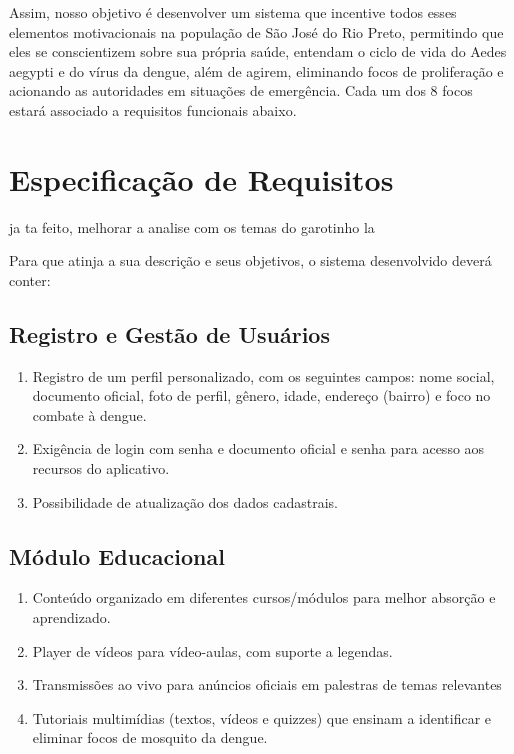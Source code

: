 \documentclass[a4paper, 12pt]{article}
\begin{document}
Assim, nosso objetivo é desenvolver um sistema que incentive todos esses elementos motivacionais na população de São José do Rio Preto, permitindo que eles se conscientizem sobre sua própria saúde, entendam o ciclo de vida do Aedes aegypti e do vírus da dengue, além de agirem, eliminando focos de proliferação e acionando as autoridades em situações de emergência. Cada um dos 8 focos estará associado a requisitos funcionais abaixo.

\newpage
\section{Especificação de Requisitos}

ja ta feito, melhorar a analise com os temas do garotinho la

Para que atinja a sua descrição e seus objetivos, o sistema desenvolvido deverá conter:

\subsection{Registro e Gestão de Usuários}
\begin{enumerate}
    \item Registro de um perfil personalizado, com os seguintes campos: nome social, documento oficial, foto de perfil, gênero, idade, endereço (bairro) e foco no combate à dengue.
    \item Exigência de login com senha e documento oficial e senha para acesso aos recursos do aplicativo.
    \item Possibilidade de atualização dos dados cadastrais.
\end{enumerate}

\subsection{Módulo Educacional}
\begin{enumerate}
    \item Conteúdo organizado em diferentes cursos/módulos para melhor absorção e aprendizado.
    \item Player de vídeos para vídeo-aulas, com suporte a legendas.
    \item Transmissões ao vivo para anúncios oficiais em palestras de temas relevantes
    \item Tutoriais multimídias (textos, vídeos e quizzes) que ensinam a identificar e eliminar focos de mosquito da dengue.
\end{enumerate}
\end{document}
